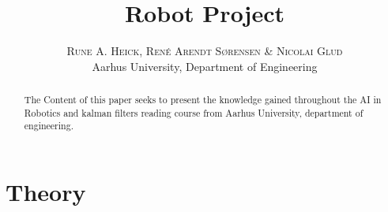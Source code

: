 


\title{\vspace{-15mm}\fontsize{24pt}{10pt}\selectfont\textbf{Robot Project}} %

\author{
\large
\textsc{Rune A. Heick, René Arendt Sørensen \& Nicolai Glud}\\[2mm] %
\normalsize Aarhus University, Department of Engineering \\ %
\vspace{-5mm}
}
\date{}




\maketitle %

\newpage

\begin{abstract}
The Content of this paper seeks to present the knowledge gained throughout the AI in Robotics and kalman filters reading course from Aarhus University, department of engineering. 
\end{abstract}
\tableofcontents



\chapter{Theory}




